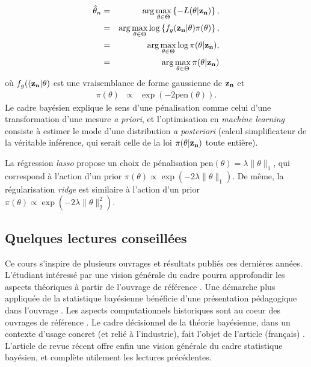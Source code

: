 \begin{eqnarray*}
\hat{\theta}_n & = & \arg\max\limits_{\theta\in\Theta} \left\{- L(\theta|{\bf z_n})\right\}, \\
& = & \arg\max\limits_{\theta\in\Theta} \log\left\{f_g({\bf z_n}|\theta)\pi(\theta)\right\}, \\
& = & \arg\max\limits_{\theta\in\Theta}\log \pi(\theta|{\bf z_n}), \\
& = & \arg\max\limits_{\theta\in\Theta} \pi(\theta|{\bf z_n})
\end{eqnarray*}
où  $f_g(({\bf z_n}|\theta)$ est une vraisemblance de forme gaussienne de ${\bf z_n}$ et 
\begin{eqnarray*}
\pi(\theta) & \propto & \exp(-2\mbox{pen}(\theta)).
\end{eqnarray*}
Le cadre bayésien explique le sens d'une pénalisation comme celui d'une transformation d'une mesure {\it a priori}, et l'optimisation en \emph{machine learning} consiste à estimer le mode d'une distribution {\it a posteriori} (calcul simplificateur de la véritable inférence, qui serait celle de la loi $\pi(\theta|{\bf z_n})$ toute entière). \\

\begin{exo}
La régression \emph{lasso} propose un choix de pénalisation 
$\mbox{pen}(\theta)=\lambda\|\theta\|_1$, qui correspond à l'action d'un prior $\pi(\theta)\propto\exp(-2\lambda\|\theta\|_1)$. De même, la régularisation \emph{ridge} est similaire à l'action d'un prior $\pi(\theta)\propto\exp(-2\lambda\|\theta\|^2_2)$.
\end{exo}

\subsection{Quelques lectures conseillées}


Ce cours s'inspire de plusieurs ouvrages et résultats publiés ces dernières années. L'étudiant intéressé par une vision générale du cadre pourra approfondir les aspects théoriques à partir de l'ouvrage de référence \cite{Robert2007}. Une démarche plus appliquée de la statistique bayésienne bénéficie d'une présentation pédagogique dans l'ouvrage \cite{Parent2007}. Les aspects computationnels historiques sont au coeur des ouvrages de référence \cite{Robert2004,Marin2007}. Le cadre décisionnel de la théorie bayésienne, dans un contexte d'usage concret (et relié à l'industrie), fait l'objet de l'article (fran\c cais) \cite{Keller2012}. \\

L'article de revue récent \cite{Schoot2021} offre enfin une vision générale du cadre statistique bayésien, et complète utilement les lectures précédentes.